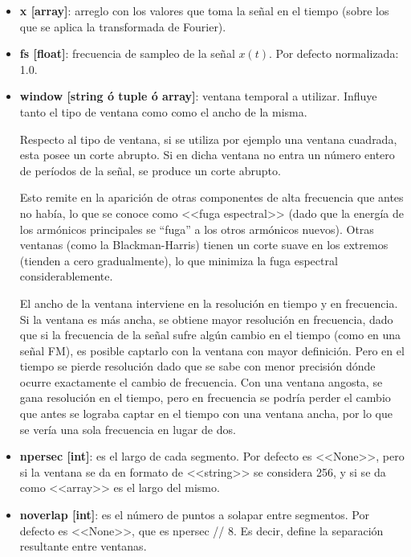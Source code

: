 \documentclass[e2_tp1_main.tex]{subfiles}
\begin{document}
\begin{itemize}

\item \textbf{x [array]}: arreglo con los valores que toma la se\~nal en el tiempo (sobre los que se aplica la transformada de Fourier).

\item \textbf{fs [float]}: frecuencia de sampleo de la se\~nal $x(t)$. Por defecto normalizada: 1.0.

\item \textbf{window [string \'o tuple \'o array]}: ventana temporal a utilizar. Influye tanto el tipo de ventana como como el ancho de la misma.\par
Respecto al tipo de ventana, si se utiliza por ejemplo una ventana cuadrada, esta posee un corte abrupto. Si en dicha ventana no entra un n\'umero entero de per\'iodos de la se\~nal, se produce un corte abrupto.\par
Esto remite en la aparici\'on de otras componentes de alta frecuencia que antes no hab\'ia, lo que se conoce como <<fuga espectral>> (dado que la energ\'ia de los arm\'onicos principales se ``fuga'' a los otros arm\'onicos nuevos). Otras ventanas (como la Blackman-Harris) tienen un corte suave en los extremos (tienden a cero gradualmente), lo que minimiza la fuga espectral considerablemente.\par
El ancho de la ventana interviene en la resoluci\'on en tiempo y en frecuencia. Si la ventana es m\'as ancha, se obtiene mayor resoluci\'on en frecuencia, dado que si la frecuencia de la se\~nal sufre alg\'un cambio en el tiempo (como en una se\~nal FM), es posible captarlo con la ventana con mayor definici\'on. Pero en el tiempo se pierde resoluci\'on dado que se sabe con menor precisi\'on d\'onde ocurre exactamente el cambio de frecuencia. Con una ventana angosta, se gana resoluci\'on en el tiempo, pero en frecuencia se podr\'ia perder el cambio que antes se lograba captar en el tiempo con una ventana ancha, por lo que se ver\'ia una sola frecuencia en lugar de dos.

\item \textbf{npersec [int]}: es el largo de cada segmento. Por defecto es <<None>>, pero si la ventana se da en formato de <<string>> se considera 256, y si se da como <<array>> es el largo del mismo.

\item \textbf{noverlap [int]}: es el n\'umero de puntos a solapar entre segmentos. Por defecto es <<None>>, que es npersec // 8. Es decir, define la separaci\'on resultante entre ventanas.


\end{itemize}
\end{document}
